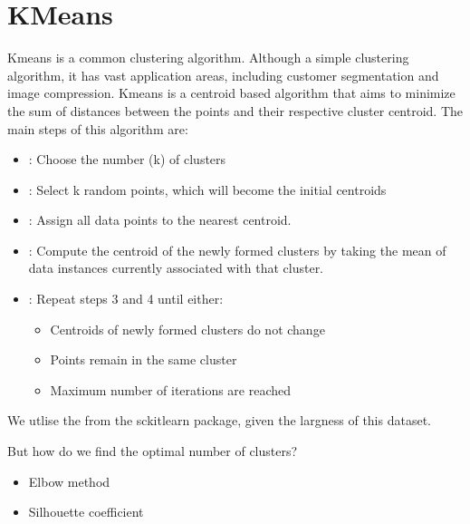 \documentclass[letterpaper,10pt,english]{jupyterBook}
\begin{document}
\section{K\sphinxhyphen{}Means}
\label{\detokenize{Clustering_Analysis:k-means}}
\sphinxAtStartPar
K\sphinxhyphen{}means is a common clustering algorithm. Although a simple clustering algorithm, it has vast application areas, including customer segmentation and image compression. K\sphinxhyphen{}means is a centroid based algorithm that aims to minimize the sum of distances between the points and their respective cluster centroid.  The main steps of this algorithm are:
\begin{itemize}
\item {} 
\sphinxAtStartPar
{}: Choose the number (k) of clusters

\item {} 
\sphinxAtStartPar
{}: Select k random points, which will become the initial centroids

\item {} 
\sphinxAtStartPar
{}: Assign all data points to the nearest centroid.

\item {} 
\sphinxAtStartPar
{}: Compute the centroid of the newly formed clusters by taking the
mean of data instances currently associated with that cluster.

\item {} 
\sphinxAtStartPar
{}: Repeat steps 3 and 4 until either:
\begin{itemize}
\item {} 
\sphinxAtStartPar
Centroids of newly formed clusters do not change

\item {} 
\sphinxAtStartPar
Points remain in the same cluster

\item {} 
\sphinxAtStartPar
Maximum number of iterations are reached

\end{itemize}

\end{itemize}

\sphinxAtStartPar
We utlise the  from the sckit\sphinxhyphen{}learn package, given the largness of this dataset.

\sphinxAtStartPar
But how do we find the optimal number of clusters?
\begin{itemize}
\item {} 
\sphinxAtStartPar
Elbow method

\item {} 
\sphinxAtStartPar
Silhouette coefficient

\end{itemize}
\end{document}

